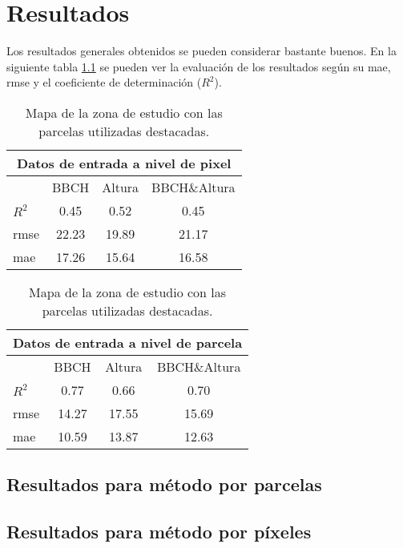 
\chapter{Resultados}
\label{resultados}
\par Los resultados generales obtenidos se pueden considerar bastante buenos. En la siguiente tabla \ref{tab:error} se pueden ver la evaluación de los resultados según su \gls{mae}, \gls{rmse} y el coeficiente de determinación ($R^2$).

\begin{table}[h]\label{tab:error}
\centering
\begin{tabular}{lccc}
\multicolumn{4}{c}{Datos de entrada a nivel de pixel}                            \\ \hline
\multicolumn{1}{l|}{}                            & BBCH  & Altura & BBCH\&Altura \\ \cline{2-4} 
\multicolumn{1}{l|}{$R^2$}                       & 0.45  & 0.52   & 0.45         \\
\multicolumn{1}{l|}{\gls{rmse}} 				 & 22.23 & 19.89  & 21.17        \\
\multicolumn{1}{l|}{\gls{mae}}  				 & 17.26 & 15.64  & 16.58       
\end{tabular}
\caption{Mapa de la zona de estudio con las parcelas utilizadas destacadas.}
\end{table}

\begin{table}[h]\label{tab:error2}
\centering
\begin{tabular}{lccc}
\multicolumn{4}{c}{Datos de entrada a nivel de parcela}                            \\ \hline
\multicolumn{1}{l|}{}                            & BBCH  & Altura & BBCH\&Altura \\ \cline{2-4} 
\multicolumn{1}{l|}{$R^2$}                       & 0.77  & 0.66   & 0.70 \\
\multicolumn{1}{l|}{\gls{rmse}} 				 & 14.27 & 17.55  & 15.69 \\
\multicolumn{1}{l|}{\gls{mae}}  				 & 10.59 & 13.87  & 12.63       
\end{tabular}
\caption{Mapa de la zona de estudio con las parcelas utilizadas destacadas.}
\end{table}


\section{Resultados para método por parcelas}
\section{Resultados para método por píxeles} 
